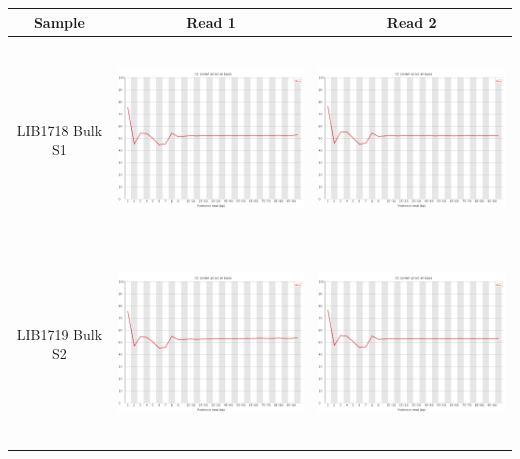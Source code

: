 \begin{center}
\begin{tabular}{ccc}
\toprule
Sample  & Read 1 & Read 2 \\ \midrule 
\\
\begin{sideways}LIB1718 Bulk S1\end{sideways} & \includegraphics[height=5cm]{Appendices/images/Sample_LIB1718_base_gc_R1.png} & \includegraphics[height=5cm]{Appendices/images/Sample_LIB1718_base_gc_R2.png} \\ \midrule  \\
\begin{sideways}LIB1719 Bulk S2\end{sideways} & \includegraphics[height=5cm]{Appendices/images/Sample_LIB1719_base_gc_R1.png} & \includegraphics[height=5cm]{Appendices/images/Sample_LIB1719_base_gc_R2.png} \\ \midrule  \\

\end{tabular}
\end{center}
